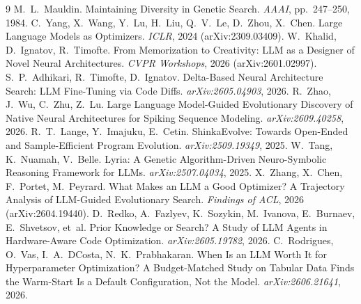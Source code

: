 \documentclass[11pt,a4paper]{article}
\begin{document}
\begin{thebibliography}{9}
 M.~L.~Mauldin. Maintaining Diversity in Genetic Search. \emph{AAAI}, pp.~247--250, 1984.
 C.~Yang, X.~Wang, Y.~Lu, H.~Liu, Q.~V.~Le, D.~Zhou, X.~Chen. Large Language Models as Optimizers. \emph{ICLR}, 2024 (arXiv:2309.03409).
 W.~Khalid, D.~Ignatov, R.~Timofte. From Memorization to Creativity: LLM as a Designer of Novel Neural Architectures. \emph{CVPR Workshops}, 2026 (arXiv:2601.02997).
 S.~P.~Adhikari, R.~Timofte, D.~Ignatov. Delta-Based Neural Architecture Search: LLM Fine-Tuning via Code Diffs. \emph{arXiv:2605.04903}, 2026.
 R.~Zhao, J.~Wu, C.~Zhu, Z.~Lu. Large Language Model-Guided Evolutionary Discovery of Native Neural Architectures for Spiking Sequence Modeling. \emph{arXiv:2609.40258}, 2026.
 R.~T.~Lange, Y.~Imajuku, E.~Cetin. ShinkaEvolve: Towards Open-Ended and Sample-Efficient Program Evolution. \emph{arXiv:2509.19349}, 2025.
 W.~Tang, K.~Nuamah, V.~Belle. Lyria: A Genetic Algorithm-Driven Neuro-Symbolic Reasoning Framework for LLMs. \emph{arXiv:2507.04034}, 2025.
 X.~Zhang, X.~Chen, F.~Portet, M.~Peyrard. What Makes an LLM a Good Optimizer? A Trajectory Analysis of LLM-Guided Evolutionary Search. \emph{Findings of ACL}, 2026 (arXiv:2604.19440).
 D.~Redko, A.~Fazlyev, K.~Sozykin, M.~Ivanova, E.~Burnaev, E.~Shvetsov, et~al. Prior Knowledge or Search? A Study of LLM Agents in Hardware-Aware Code Optimization. \emph{arXiv:2605.19782}, 2026.
 C.~Rodrigues, O.~Vas, I.~A.~DCosta, N.~K.~Prabhakaran. When Is an LLM Worth It for Hyperparameter Optimization? A Budget-Matched Study on Tabular Data Finds the Warm-Start Is a Default Configuration, Not the Model. \emph{arXiv:2606.21641}, 2026.
\end{thebibliography}
\end{document}
